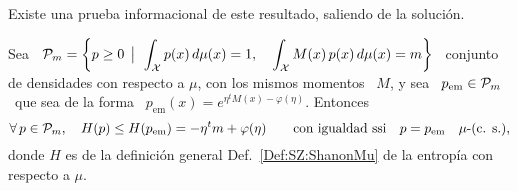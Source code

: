 Existe   una  prueba   informacional   de  este   resultado,   saliendo  de   la
soluci\'on.
%
\begin{lema}
\label{Lem:SZ:MaxEntPruebaInfo}
%
  Sea \  $\displaystyle \P_m =  \left\{ p  \ge 0 \tq  \int_\X p(x) \,  d\mu(x) =
  1,  \quad  \int_\X M(x)  \,  p(x)  \, d\mu(x)  =  m  \right\}$ \  conjunto  de
  densidades  con respecto  a $\mu$,  con los  mismos momentos  \ $M$,  y sea  \
  $p_{\mathrm{em}}  \in \P_m$  \ que  sea de  la forma  \ $p_{\mathrm{em}}(x)  =
  e^{\eta^t M(x) - \varphi(\eta)}$. Entonces
  \[
  \forall  \,  p \in  \P_m,  \quad  H(p) \le  H(p_{\mathrm{em}})  =  - \eta^t  m
  +    \varphi(\eta)    \qquad   \mbox{con    igualdad    ssi}    \quad   p    =
  p_{\mathrm{em}} \quad \mu\mbox{-(c. s.)}, \]
  donde   $H$  es   de  la   definici\'on   general  Def.~\ref{Def:SZ:ShanonMu}
  de la entrop\'ia con respecto a $\mu$.
\end{lema}
%

